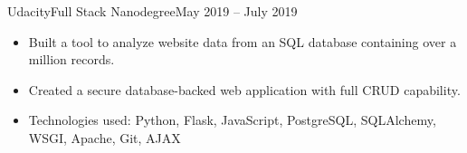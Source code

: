 \begin{cvsubsection}{Udacity}{Full Stack Nanodegree}{May 2019 -- July 2019}
	\begin{itemize}
		\item Built a tool to analyze website data from an SQL database containing over a million records.
		\item Created a secure database-backed web application with full CRUD capability.
		\item Technologies used: Python, Flask, JavaScript, PostgreSQL, SQLAlchemy, WSGI, Apache, Git, AJAX
	\end{itemize}
\end{cvsubsection}